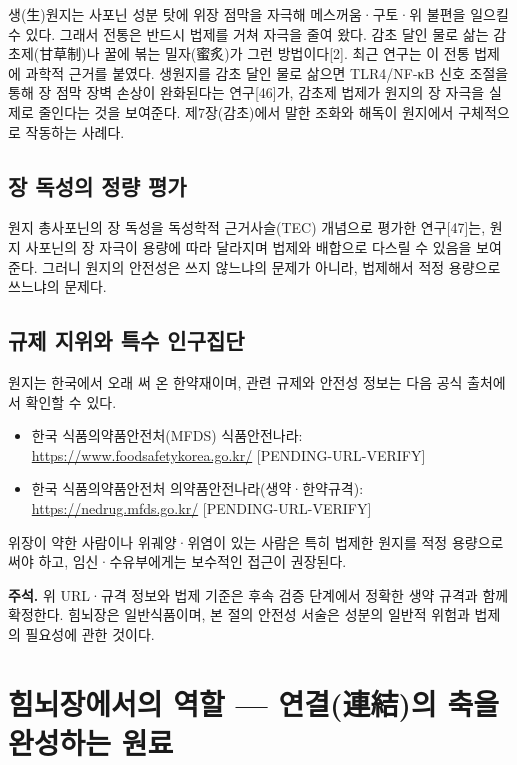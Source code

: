 \documentclass[12pt,oneside]{book}
\newenvironment{authnote}
  {\par\smallskip\begingroup\leftskip=6mm\rightskip=3mm\small\color{muted}\noindent\ignorespaces}
  {\par\endgroup\smallskip}
\begin{document}
생(生)원지는 사포닌 성분 탓에 위장 점막을 자극해 메스꺼움·구토·위 불편을 일으킬 수 있다. 그래서 전통은 반드시 법제를 거쳐 자극을 줄여 왔다. 감초 달인 물로 삶는 감초제(甘草制)나 꿀에 볶는 밀자(蜜炙)가 그런 방법이다[2]. 최근 연구는 이 전통 법제에 과학적 근거를 붙였다. 생원지를 감초 달인 물로 삶으면 TLR4/NF-κB 신호 조절을 통해 장 점막 장벽 손상이 완화된다는 연구[46]가, 감초제 법제가 원지의 장 자극을 실제로 줄인다는 것을 보여준다. 제7장(감초)에서 말한 조화와 해독이 원지에서 구체적으로 작동하는 사례다.

\subsection{장 독성의 정량 평가}

원지 총사포닌의 장 독성을 독성학적 근거사슬(TEC) 개념으로 평가한 연구[47]는, 원지 사포닌의 장 자극이 용량에 따라 달라지며 법제와 배합으로 다스릴 수 있음을 보여준다. 그러니 원지의 안전성은 쓰지 않느냐의 문제가 아니라, 법제해서 적정 용량으로 쓰느냐의 문제다.

\subsection{규제 지위와 특수 인구집단}

원지는 한국에서 오래 써 온 한약재이며, 관련 규제와 안전성 정보는 다음 공식 출처에서 확인할 수 있다.

\begin{itemize}[leftmargin=6mm,itemsep=1pt,topsep=2pt]
  \item 한국 식품의약품안전처(MFDS) 식품안전나라: \url{https://www.foodsafetykorea.go.kr/} [PENDING-URL-VERIFY]
  \item 한국 식품의약품안전처 의약품안전나라(생약·한약규격): \url{https://nedrug.mfds.go.kr/} [PENDING-URL-VERIFY]
\end{itemize}

위장이 약한 사람이나 위궤양·위염이 있는 사람은 특히 법제한 원지를 적정 용량으로 써야 하고, 임신·수유부에게는 보수적인 접근이 권장된다.

\begin{authnote}\textbf{주석.} 위 URL·규격 정보와 법제 기준은 후속 검증 단계에서 정확한 생약 규격과 함께 확정한다. 힘뇌장은 일반식품이며, 본 절의 안전성 서술은 성분의 일반적 위험과 법제의 필요성에 관한 것이다.\end{authnote}

\section{힘뇌장에서의 역할 — 연결(連結)의 축을 완성하는 원료}
\end{document}
